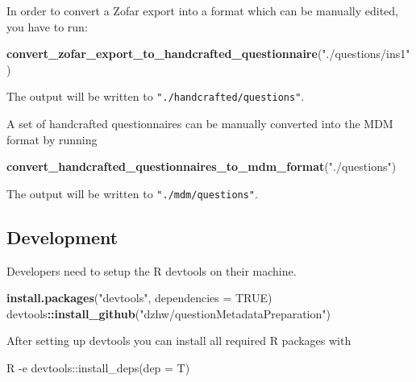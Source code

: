 \documentclass[
]{article}
\newenvironment{Shaded}{\begin{snugshade}}{\end{snugshade}}
\newcommand{\DataTypeTok}[1]{\textcolor[rgb]{0.13,0.29,0.53}{#1}}
\newcommand{\ExtensionTok}[1]{#1}
\newcommand{\KeywordTok}[1]{\textcolor[rgb]{0.13,0.29,0.53}{\textbf{#1}}}
\newcommand{\NormalTok}[1]{#1}
\newcommand{\OperatorTok}[1]{\textcolor[rgb]{0.81,0.36,0.00}{\textbf{#1}}}
\newcommand{\OtherTok}[1]{\textcolor[rgb]{0.56,0.35,0.01}{#1}}
\newcommand{\StringTok}[1]{\textcolor[rgb]{0.31,0.60,0.02}{#1}}
\begin{document}
In order to convert a Zofar export into a format which can be manually
edited, you have to run:

\begin{Shaded}
\begin{Highlighting}[]
\KeywordTok{convert\_zofar\_export\_to\_handcrafted\_questionnaire}\NormalTok{(}\StringTok{"./questions/ins1"}\NormalTok{)}
\end{Highlighting}
\end{Shaded}

The output will be written to \texttt{"./handcrafted/questions"}.

A set of handcrafted questionnaires can be manually converted into the
MDM format by running

\begin{Shaded}
\begin{Highlighting}[]
\KeywordTok{convert\_handcrafted\_questionnaires\_to\_mdm\_format}\NormalTok{(}\StringTok{"./questions"}\NormalTok{)}
\end{Highlighting}
\end{Shaded}

The output will be written to \texttt{"./mdm/questions"}.

\hypertarget{development}{%
\subsection{Development}\label{development}}

Developers need to setup the R devtools on their machine.

\begin{Shaded}
\begin{Highlighting}[]
\KeywordTok{install.packages}\NormalTok{(}\StringTok{"devtools"}\NormalTok{, }\DataTypeTok{dependencies =} \OtherTok{TRUE}\NormalTok{)}
\NormalTok{devtools}\OperatorTok{::}\KeywordTok{install\_github}\NormalTok{(}\StringTok{"dzhw/questionMetadataPreparation"}\NormalTok{)}
\end{Highlighting}
\end{Shaded}

After setting up devtools you can install all required R packages with

\begin{Shaded}
\begin{Highlighting}[]
\ExtensionTok{R}\NormalTok{ {-}e }\StringTok{\textquotesingle{}devtools::install\_deps(dep = T)\textquotesingle{}}
\end{Highlighting}
\end{Shaded}
\end{document}
